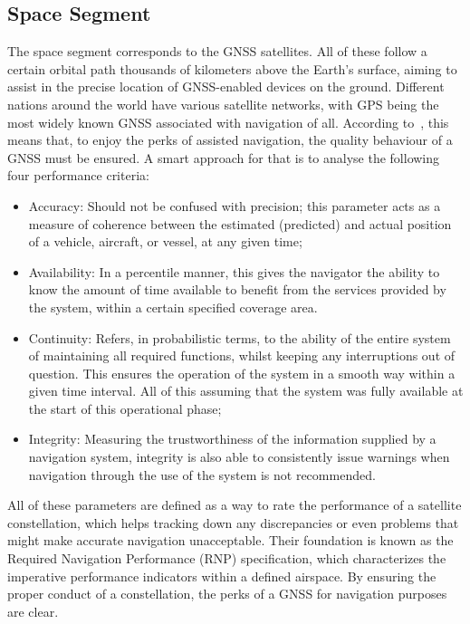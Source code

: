 \subsection{Space Segment}\label{sec:II_gnss_space_seg}

The space segment corresponds to the GNSS satellites. All of these follow a certain orbital path thousands of kilometers above the Earth's surface, aiming to assist in the precise location of GNSS-enabled devices on the ground.
Different nations around the world have various satellite networks, with GPS being the most widely known GNSS associated with navigation of all.
According to~\cite{fed_rad_plan_2008}, this means that, to enjoy the perks of assisted navigation, the quality behaviour of a GNSS must be ensured. 
A smart approach for that is to analyse the following four performance criteria:

\begin{itemize}
    \item Accuracy: Should not be confused with precision; this parameter acts as a measure of coherence between the estimated (predicted) and actual position of a vehicle, aircraft, or vessel, at any given time;
    \item Availability: In a percentile manner, this gives the navigator the ability to know the amount of time available to benefit from the services provided by the system, within a certain specified coverage area.
    \item Continuity: Refers, in probabilistic terms, to the ability of the entire system of maintaining all required functions, whilst keeping any interruptions out of question. This ensures the operation of the system in a smooth way within a given time interval. All of this assuming that the system was fully available at the start of this operational phase;
    \item Integrity: Measuring the trustworthiness of the information supplied by a navigation system, integrity is also able to consistently issue warnings when navigation through the use of the system is not recommended.
\end{itemize}
All of these parameters are defined as a way to rate the performance of a satellite constellation, which helps tracking down any discrepancies or even problems that might make accurate navigation unacceptable.
Their foundation is known as the Required Navigation Performance (RNP) specification, which characterizes the imperative performance indicators within a defined airspace. By ensuring the proper conduct of a constellation, the perks of a GNSS for navigation purposes are clear.

